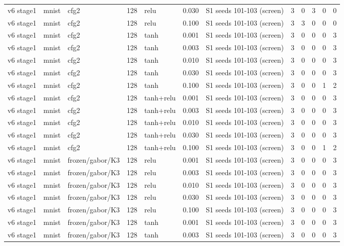 \begin{table}[htbp]
{\begin{tabular}{@{}lllrlrlrrrrr@{}}
v6 stage1 & mnist & cfg2 & 128 & relu & 0.030 & S1 seeds 101-103 (screen) & 3 & 0 & 3 & 0 & 0 \\
v6 stage1 & mnist & cfg2 & 128 & relu & 0.100 & S1 seeds 101-103 (screen) & 3 & 3 & 0 & 0 & 0 \\
v6 stage1 & mnist & cfg2 & 128 & tanh & 0.001 & S1 seeds 101-103 (screen) & 3 & 0 & 0 & 0 & 3 \\
v6 stage1 & mnist & cfg2 & 128 & tanh & 0.003 & S1 seeds 101-103 (screen) & 3 & 0 & 0 & 0 & 3 \\
v6 stage1 & mnist & cfg2 & 128 & tanh & 0.010 & S1 seeds 101-103 (screen) & 3 & 0 & 0 & 0 & 3 \\
v6 stage1 & mnist & cfg2 & 128 & tanh & 0.030 & S1 seeds 101-103 (screen) & 3 & 0 & 0 & 0 & 3 \\
v6 stage1 & mnist & cfg2 & 128 & tanh & 0.100 & S1 seeds 101-103 (screen) & 3 & 0 & 0 & 1 & 2 \\
v6 stage1 & mnist & cfg2 & 128 & tanh+relu & 0.001 & S1 seeds 101-103 (screen) & 3 & 0 & 0 & 0 & 3 \\
v6 stage1 & mnist & cfg2 & 128 & tanh+relu & 0.003 & S1 seeds 101-103 (screen) & 3 & 0 & 0 & 0 & 3 \\
v6 stage1 & mnist & cfg2 & 128 & tanh+relu & 0.010 & S1 seeds 101-103 (screen) & 3 & 0 & 0 & 0 & 3 \\
v6 stage1 & mnist & cfg2 & 128 & tanh+relu & 0.030 & S1 seeds 101-103 (screen) & 3 & 0 & 0 & 0 & 3 \\
v6 stage1 & mnist & cfg2 & 128 & tanh+relu & 0.100 & S1 seeds 101-103 (screen) & 3 & 0 & 0 & 1 & 2 \\
v6 stage1 & mnist & frozen/gabor/K3 & 128 & relu & 0.001 & S1 seeds 101-103 (screen) & 3 & 0 & 0 & 0 & 3 \\
v6 stage1 & mnist & frozen/gabor/K3 & 128 & relu & 0.003 & S1 seeds 101-103 (screen) & 3 & 0 & 0 & 0 & 3 \\
v6 stage1 & mnist & frozen/gabor/K3 & 128 & relu & 0.010 & S1 seeds 101-103 (screen) & 3 & 0 & 0 & 0 & 3 \\
v6 stage1 & mnist & frozen/gabor/K3 & 128 & relu & 0.030 & S1 seeds 101-103 (screen) & 3 & 0 & 0 & 0 & 3 \\
v6 stage1 & mnist & frozen/gabor/K3 & 128 & relu & 0.100 & S1 seeds 101-103 (screen) & 3 & 0 & 0 & 0 & 3 \\
v6 stage1 & mnist & frozen/gabor/K3 & 128 & tanh & 0.001 & S1 seeds 101-103 (screen) & 3 & 0 & 0 & 0 & 3 \\
v6 stage1 & mnist & frozen/gabor/K3 & 128 & tanh & 0.003 & S1 seeds 101-103 (screen) & 3 & 0 & 0 & 0 & 3 \\

\end{tabular}}
\end{table}
